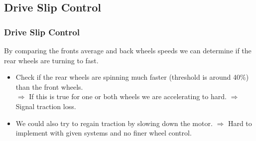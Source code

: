\documentclass{beamer}
\begin{document}
\subsection{Drive Slip Control}
\begin{frame}
    \frametitle{Drive Slip Control}
    By comparing the fronts average and back wheels speeds we can determine if the rear wheels are turning to fast. 
    \begin{itemize}
     \item Check if the rear wheels are spinning much faster (threshold is around 40\%) than the front wheels.\\
     $\Rightarrow$ If this is true for one or both wheels we are accelerating to hard.
     $\Rightarrow$ Signal traction loss.
     \item We could also try to regain traction by slowing down the motor.
     $\Rightarrow$ Hard to implement with given systems and no finer wheel control. \\
    \end{itemize}
\end{frame}
\end{document}

